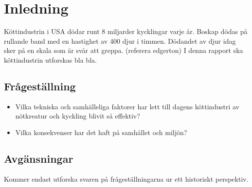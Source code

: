 \section{Inledning}
Köttindustrin i USA dödar runt 8 miljarder kycklingar varje år. Boskap dödas på rullande band med en hastighet av 400 djur i timmen. Dödandet av djur idag sker på en skala som är svår att greppa. (referera edgerton) 
\newline
\newline
I denna rapport ska köttindustrin utforskas bla bla.

\subsection{Frågeställning}
\begin{itemize}
	\item Vilka tekniska och samhälleliga faktorer har lett till dagens köttindustri av nötkreatur och kyckling blivit så effektiv?
	\item Vilka konsekvenser har det haft på samhället och miljön?
\end{itemize}

\subsection{Avgänsningar}
Kommer endast utforska svaren på frågeställningarna ur ett historiskt perspektiv. 